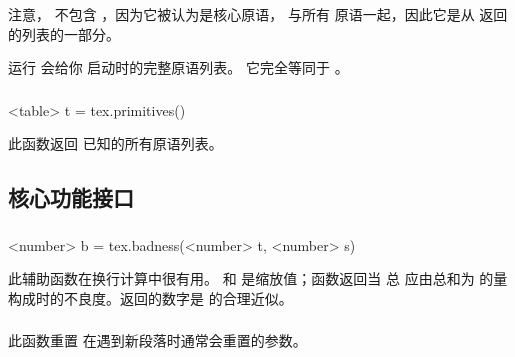 注意， 不包含 ，因为它被认为是核心原语，
与所有  原语一起，因此它是从  返回的列表的一部分。

运行  会给你  启动时的完整原语列表。
它完全等同于 。

\subsubsection{}


\begin{typing}
<table> t = tex.primitives()
\end{typing}

此函数返回 \LUATEX 已知的所有原语列表。

\subsection{核心功能接口}

\subsubsection{}


\begin{typing}
<number> b = tex.badness(<number> t, <number> s)
\end{typing}

此辅助函数在换行计算中很有用。 和  是缩放值；函数返回当
总  应由总和为  的量构成时的不良度。返回的数字是
 的合理近似。

\subsubsection{}



此函数重置 \TEX 在遇到新段落时通常会重置的参数。

\subsubsection{}


